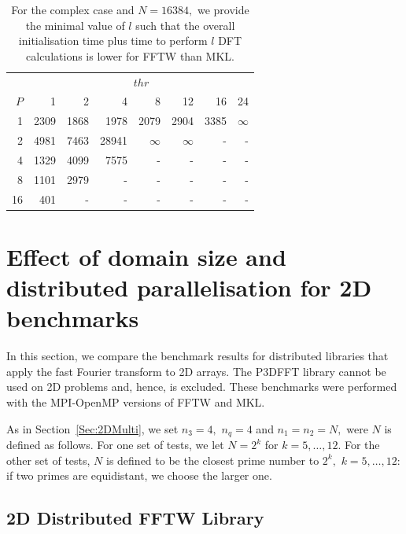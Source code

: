 \documentclass[a4paper]{article}
\begin{document}
\begin{table}
\begin{center}
\begin{tabular}{|r||r|r|r|r|r|r|r|}
  \hline
 & \multicolumn{7}{|c|}{$thr$} \\
$P$ & 1 & 2 & 4 & 8 & 12 & 16 & 24 \\ \hline
  1 &    2309 &   1868 &  1978 &  2079 &  2904 &  3385 & $\infty$   \\
  2 &     4981 &  7463 &  28941 & $\infty$ &  $\infty$ &           - &           - \\
  4 &     1329 &  4099 &   7575 &           - &          - &          - &          - \\
  8 &    1101 &   2979  &         - &          - &          - &          - &          - \\
  16 &    401 &          - &          - &          - &          - &          - &          - \\ \hline
\end{tabular}
\caption{ For the complex case and $N=16384,$ we provide the minimal value of $l$ such that the overall initialisation time plus time to perform $l$ DFT calculations is lower for FFTW than MKL.  }\label{Tbl:1Dl}
\end{center}
\end{table}

\clearpage

\section{Effect of domain size and distributed parallelisation for 2D benchmarks}\label{Sec:2DDistr}


In this section, we compare the benchmark results for distributed
libraries that apply the fast Fourier transform to 2D arrays.  The
P3DFFT library cannot be used on 2D problems and, hence, is
excluded. These benchmarks were performed with the MPI-OpenMP versions
of FFTW and MKL. 

As in Section~\ref{Sec:2DMulti}, we set $n_3=4,$ $n_q=4$ and $n_1=n_2=N,$ were $N$ is
defined as follows.  For one set of tests, we let $N=2^k$ for
$k=5,\ldots,12.$ For the other set of tests, $N$ is defined to be the
closest prime number to $2^k,$ $k=5,\ldots,12:$ if two primes are
equidistant, we choose the larger one.

\subsection{2D Distributed FFTW Library}\label{Sec:2DDistFFTW}
\end{document}

